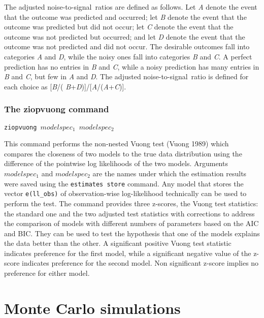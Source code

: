 \documentclass[letterpaper,fleqn,12pt]{article}
\begin{document}
The adjusted noise-to-signal\ ratios are defined as follows. Let \emph{A}
denote the event that the outcome was predicted and occurred; let \emph{B}
denote the event that the outcome was predicted but did not occur; let \emph{%
C} denote the event that the outcome was not predicted but occurred; and let 
\emph{D} denote the event that the outcome was not predicted and did not
occur. The desirable outcomes fall into categories \emph{A} and \emph{D},
while the noisy ones fall into categories \emph{B} and \emph{C}. A perfect
prediction has no entries in \emph{B} and \emph{C}, while a noisy prediction
has many entries in \emph{B }and \emph{C}, but few in \emph{A} and \emph{D}.
The adjusted noise-to-signal\ ratio is defined for each choice as [\emph{B}/(%
\emph{B}+\emph{D})]/[\emph{A}/(\emph{A}+\emph{C})].

\subsubsection*{The ziopvuong command}

\texttt{ziopvuong $modelspec_{1}$ $modelspec_{2}$}

\smallskip 

This command performs the non-nested Vuong test (Vuong 1989) which compares
the closeness of two models to the true data distribution using the
difference of the pointwise log likelihoods of the two models. Arguments 
\texttt{$modelspec_{1}$} and \texttt{$modelspec_{2}$} are the names under
which the estimation results were saved using the \texttt{estimates store}
command. Any model that stores the vector \texttt{e(ll\_obs)} of
observation-wise log-likelihood technically can be used to perform the test.
The command provides three z-scores, the Vuong test statistics: the standard
one and the two adjusted test statistics with corrections to address the
comparison of models with different numbers of parameters based on the AIC
and BIC. They can be used to test the hypothesis that one of the models
explains the data better than the other. A significant positive Vuong test
statistic indicates preference for the first model, while a significant
negative value of the z-score indicates preference for the second model. Non
significant z-score implies no preference for either model.

\section{Monte Carlo simulations}
\end{document}
